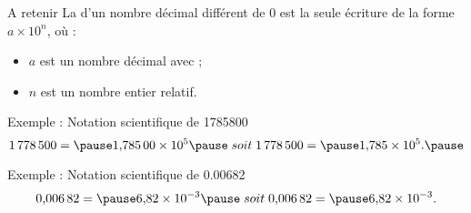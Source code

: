 \documentclass[xcolor={dvipsnames}]{beamer}
\begin{document}
\begin{frame}
	\begin{alertblock}{A retenir}
		La  d'un nombre décimal différent de $0$ est la seule écriture de la forme $a \times 10^n$, où :
		
		\begin{itemize}
			\item $a$ est un nombre décimal avec ;
			\item $n$ est un nombre entier relatif.
		\end{itemize}
	\end{alertblock}
	
	\begin{exampleblock}{Exemple : Notation scientifique de \num{1785800}}
		\begin{equation*}
			\num{1778500} = \pause \num{1.78500e5}\pause \;  soit \; \num{1778500} = \pause \num{1.785e5}.\pause
		\end{equation*}		
		
	\end{exampleblock}
	
	\begin{exampleblock}{Exemple : Notation scientifique de \num{0.00682}}
		\begin{equation*}
		\num{0.00682} = \pause \num{0006.82e-3}\pause \;  soit \; \num{0.00682} = \pause \num{6.82e-3}.
		\end{equation*}		
		
	\end{exampleblock}
\end{frame}
\end{document}
